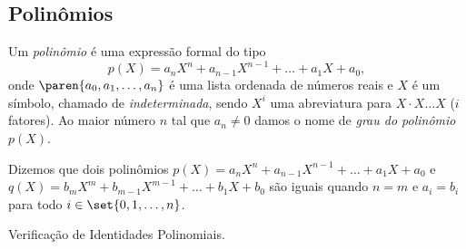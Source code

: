 \subsection{Polinômios}
\label{sec:polinomios}

\begin{definition}[Polinômio]
Um \emph{polinômio} é uma expressão formal do tipo
$$p(X) = a_n X^n+ a_{n-1} X^{n-1} + \dots + a_1X + a_0,$$
onde $\paren{a_0, a_1 , \dots , a_n}$ é uma lista ordenada de
números reais e $X$ é um símbolo, chamado de \emph{indeterminada},
sendo $X^i$ uma abreviatura para $X\cdot X  \dots  X$ ($i$ fatores).
Ao maior número $n$ tal que $a_n \neq 0$ damos o nome de \emph{grau
do polinômio $p(X)$}.
\end{definition}

\begin{definition}
Dizemos que dois polinômios $p(X) = a_n X^n+ a_{n-1} X^{n-1} + \dots
+ a_1X + a_0$ e $q(X) = b_m X^m + b_{m-1} X^{m-1} + \dots + b_1X +
b_0$ são iguais quando $n=m$ e $a_i = b_i$ para todo $i \in \set{0,
1, \dots , n}$.
\end{definition}

\begin{onlineact}
    {Verificação de Identidades Polinomiais}.
\end{onlineact}